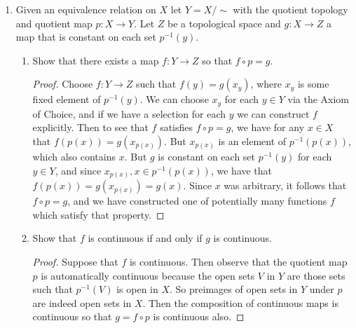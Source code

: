 \documentclass[11pt]{article}
\DeclareMathOperator{\id}{id}
\begin{document}
\begin{enumerate}
\begin{enumerate}
\begin{proof}
            Let $g = \alpha\ast \overline{\beta}$. With $\hat{g} = \widehat{\alpha\ast \overline{\beta}} = \hat{\overline{\beta}}\circ \hat{\alpha} = \hat{\beta}^{-1}\circ \hat{\alpha}$, it follows that $\hat{g}^{\prime} = (\hat{\beta}^{-1}\circ \hat{\alpha})^{\prime} = (\hat{\beta}^{-1})^{\prime}\circ \hat{\alpha}^{\prime} = (\hat{\beta}^{\prime})^{-1}\circ \hat{\alpha}^{\prime}$. Then we show that $\hat{g}^{\prime}$ is the identity map on $\pi_1(X,x_0)/[\pi_1(X,x_0),\pi_1(X,x_0)]$: \begin{align*}
                f[\pi_1(X,x_0),\pi_1(X,x_0)]\mapsto \hat{g}(f)[\pi_1(X,x_0),\pi_1(X,x_0)] &= (g^{-1}fg)[\pi_1(X,x_0),\pi_1(X,x_0)]\\
                &=(fgg^{-1})[\pi_1(X,x_0),\pi_1(X,x_0)]\\
                &= f[\pi_1(X,x_0),\pi_1(X,x_0)],
            \end{align*} since the quotient group is Abelian. It follows that $(\hat{\beta}^{\prime})^{-1}\circ \hat{\alpha}^{\prime} = \hat{g}^{\prime} = \id_{\pi_1(X,x_0)/[\pi_1(X,x_0),\pi_1(X,x_0)]}$ so that $\hat{\alpha}^{\prime} = \hat{\beta}^{\prime}$ as desired.
        \end{proof}
    \end{enumerate}
    \item Given an equivalence relation on $X$ let $Y = X/\!\!\sim$ with the quotient topology and quotient map $p\colon X\to Y$. Let $Z$ be a topological space and $g\colon X\to Z$ a map that is constant on each set $p^{-1}(y)$. \begin{enumerate}
        \item Show that there exists a map $f\colon Y\to Z$ so that $f\circ p  = g$. \begin{proof}
            Choose $f\colon Y\to Z$ such that $f(y) = g(x_y)$, where $x_y$ is some fixed element of $p^{-1}(y)$. We can choose $x_y$ for each $y\in Y$ via the Axiom of Choice, and if we have a selection for each $y$ we can construct $f$ explicitly. Then to see that $f$ satisfies $f\circ p = g$, we have for any $x\in X$ that $f(p(x)) = g(x_{p(x)})$. But $x_{p(x)}$ is an element of $p^{-1}(p(x))$, which also contains $x$. But $g$ is constant on each set $p^{-1}(y)$ for each $y\in Y$, and since $x_{p(x)},x\in p^{-1}(p(x))$, we have that $f(p(x)) = g(x_{p(x)}) = g(x)$. Since $x$ was arbitrary, it follows that $f\circ p = g$, and we have constructed one of potentially many functions $f$ which satisfy that property.
        \end{proof}
        \item Show that $f$ is continuous if and only if $g$ is continuous. \begin{proof}
            Suppose that $f$ is continuous. Then observe that the quotient map $p$ is automatically continuous because the open sets $V$ in $Y$ are those sets such that $p^{-1}(V)$ is open in $X$. So preimages of open sets in $Y$ under $p$ are indeed open sets in $X$. Then the composition of continuous maps is continuous so that $g = f\circ p$ is continuous also.


\end{proof}
\end{enumerate}
\end{enumerate}
\end{document}
